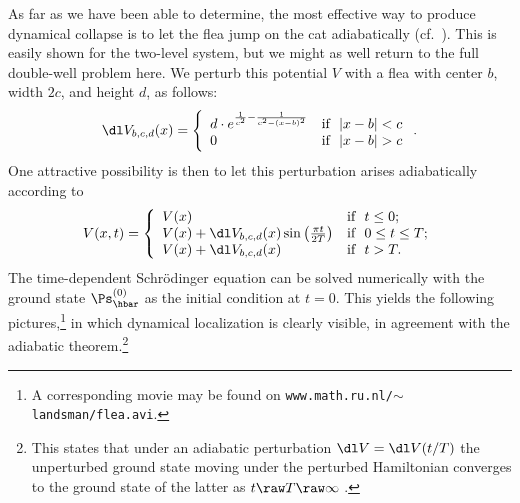 \documentclass[12pt]{article}
\begin{document}
As far as we have been able to determine, the most effective way to produce dynamical collapse is to let the flea jump on the cat adiabatically (cf.\  \cite{Griffiths}). This is easily shown for the two-level system, but we might as well return to the full double-well problem here. We perturb this potential $V$ with a flea with 
center $b$, width $2c$, and height $d$, as follows:\begin{equation}
\dl V_ {b,c,d}(x)=\left\{\begin{array}{ll}
d\cdot e^{\frac{1}{c^2}-\frac{1}{c^2-(x-b)^2}}& \mbox{if \ } |x-b|<c\\
0 & \mbox{if \ } |x-b|>c
\end{array}\right. .
\end{equation}
One attractive possibility is then to let this perturbation arises adiabatically according to
\begin{equation}
V(x,t)=\left\{\begin{array}{ll}
V(x) & \mbox{if \ } t\leq 0;\\
V(x)+\dl V_{b,c,d}(x)\sin\left(\frac{\pi t}{2T}\right) & \mbox{if \ } 0\leq t\leq T;\\
V(x)+\dl V_{b,c,d}(x) & \mbox{if \ } t>T.
\end{array}\right. 
\label{RisingPot}
\end{equation}
The time-dependent Schr\"{o}dinger equation can be solved numerically with the ground state $\Ps_{\hbar}^{(0)}$ as the initial condition at $t=0$. This yields the following pictures,\footnote{A corresponding movie may be found on \texttt{www.math.ru.nl/$\sim$landsman/flea.avi}.} in which dynamical localization is clearly visible, in agreement with the adiabatic theorem.\footnote{This states that
under an adiabatic perturbation $\dl V=\dl V(t/T)$ the unperturbed ground state moving under the perturbed Hamiltonian converges to the ground state of the latter as $t\raw T\raw\infty$ \cite{Griffiths,HJ}.}
\end{document}
